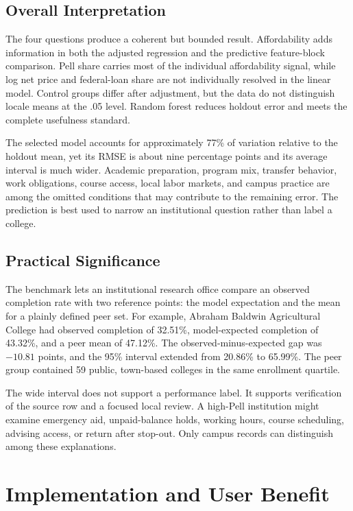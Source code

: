 \documentclass[12pt,a4paper]{article}
\begin{document}
\subsection{Overall Interpretation}

The four questions produce a coherent but bounded result. Affordability adds information in both the adjusted regression and the predictive feature-block comparison. Pell share carries most of the individual affordability signal, while log net price and federal-loan share are not individually resolved in the linear model. Control groups differ after adjustment, but the data do not distinguish locale means at the .05 level. Random forest reduces holdout error and meets the complete usefulness standard.

The selected model accounts for approximately 77\% of variation relative to the holdout mean, yet its RMSE is about nine percentage points and its average interval is much wider. Academic preparation, program mix, transfer behavior, work obligations, course access, local labor markets, and campus practice are among the omitted conditions that may contribute to the remaining error. The prediction is best used to narrow an institutional question rather than label a college.

\subsection{Practical Significance}

The benchmark lets an institutional research office compare an observed completion rate with two reference points: the model expectation and the mean for a plainly defined peer set. For example, Abraham Baldwin Agricultural College had observed completion of 32.51\%, model-expected completion of 43.32\%, and a peer mean of 47.12\%. The observed-minus-expected gap was $-10.81$ points, and the 95\% interval extended from 20.86\% to 65.99\%. The peer group contained 59 public, town-based colleges in the same enrollment quartile.

The wide interval does not support a performance label. It supports verification of the source row and a focused local review. A high-Pell institution might examine emergency aid, unpaid-balance holds, working hours, course scheduling, advising access, or return after stop-out. Only campus records can distinguish among these explanations.

\section{Implementation and User Benefit}
\end{document}
